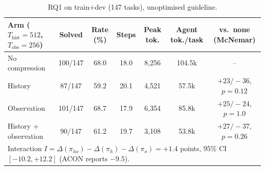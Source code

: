 \documentclass[10pt,a4paper]{article}
\begin{document}
\begin{table}[h]
\centering
\scriptsize
\renewcommand{\arraystretch}{1.12}
\setlength{\tabcolsep}{4pt}
\begin{tabular}{lcccccc}
\toprule
\textbf{Arm} ($T_{\mathrm{hist}}=512$, $T_{\mathrm{obs}}=256$) & \textbf{Solved} &
\textbf{Rate (\%)} & \textbf{Steps} & \textbf{Peak tok.} & \textbf{Agent tok./task} & \textbf{vs.\ none (McNemar)}\\
\midrule
No compression & 100/147 & 68.0 & 18.0 & 8,256 & 104.5k & --\\
History & 87/147 & 59.2 & 20.1 & 4,521 & 57.5k & $+23/-36$, $p=0.12$\\
Observation & 101/147 & 68.7 & 17.9 & 6,354 & 85.8k & $+25/-24$, $p=1.0$\\
History + observation & 90/147 & 61.2 & 19.7 & 3,108 & 53.8k & $+27/-37$, $p=0.26$\\
\midrule
\multicolumn{7}{l}{Interaction $I=\Delta(\pi_{ho})-\Delta(\pi_h)-\Delta(\pi_o)=+1.4$ points, 95\% CI $[-10.2,+12.2]$ (ACON reports $-9.5$).}\\
\bottomrule
\end{tabular}
\caption{RQ1 on train+dev (147 tasks), unoptimised guideline.}
\label{tab:rq1}
\end{table}
\end{document}
